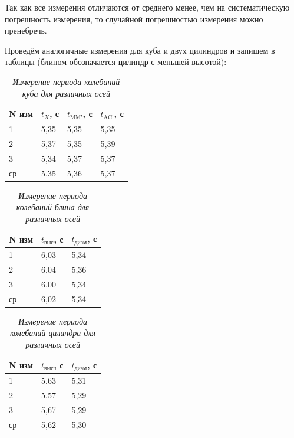 \documentclass[a4paper, 12pt]{article}
\begin{document}
Так как все измерения отличаются от среднего менее, чем на систематическую погрешность измерения, то случайной погрешностью измерения можно пренебречь.

Проведём аналогичные измерения для куба и двух цилиндров и запишем в таблицы (блином обозначается цилиндр с меньшей высотой):

\begin{table}[!ht]
    \centering
    \begin{tabular}{|l|l|l|l|}
    \hline
        N изм  & $t_X$, с & $t_\text{MM'}$, с & $t_\text{AC'}$, с \\ \hline
        1  & 5,35 & 5,35 & 5,35  \\ \hline
        2  & 5,37 & 5,35 & 5,39  \\ \hline
        3  & 5,34 & 5,37 & 5,37  \\ \hline
        ср & 5,35 & 5,36 & 5,37  \\ \hline
    \end{tabular}\caption{\textit{Измерение периода колебаний куба для различных осей}}\label{cube-t}
\end{table}

\begin{table}[!ht]
    \centering
    \begin{tabular}{|l|l|l|}
    \hline
        N изм  & $t_\text{выс}$, с & $t_\text{диам}$, с \\ \hline
        1  & 6,03 & 5,34  \\ \hline
        2  & 6,04 & 5,36  \\ \hline
        3  & 6,00 & 5,34  \\ \hline
        ср & 6,02 & 5,34  \\ \hline
    \end{tabular}\caption{\textit{Измерение периода колебаний блина для различных осей}}\label{cilinder1}
\end{table}

\begin{table}[!ht]
    \centering
    \begin{tabular}{|l|l|l|}
    \hline
        N изм  & $t_\text{выс}$, с & $t_\text{диам}$, с \\ \hline
        1  & 5,63 & 5,31  \\ \hline
        2  & 5,57 & 5,29  \\ \hline
        3  & 5,67 & 5,29  \\ \hline
        ср & 5,62 & 5,30  \\ \hline
    \end{tabular}\caption{\textit{Измерение периода колебаний цилиндра для различных осей}}\label{cilinder1}
\end{table}
\end{document}
